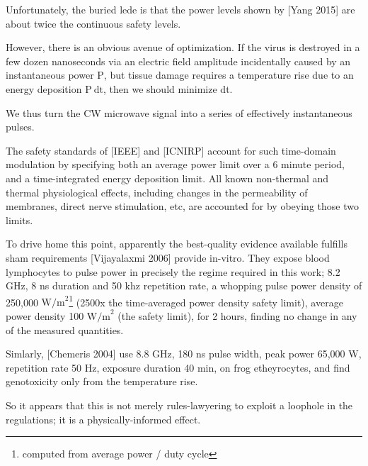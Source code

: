 \documentclass[fleqn,10pt]{article}
\begin{document}
Unfortunately, the buried lede is that the power levels shown by [Yang 2015] are about twice the continuous safety levels. 

However, there is an obvious avenue of optimization. If the virus is destroyed in a few dozen nanoseconds via an electric field amplitude incidentally caused by an instantaneous power $\text{P}$, but tissue damage requires a temperature rise due to an energy deposition $\text{P} \  \text{dt}$, then we should minimize dt.\

We thus turn the CW microwave signal into a series of effectively instantaneous pulses.

The safety standards of [IEEE] and [ICNIRP] account for such time-domain modulation by specifying both an average power limit over a 6 minute period, and a time-integrated energy deposition limit. All known non-thermal and thermal physiological effects, including changes in the permeability of membranes, direct nerve stimulation, etc, are accounted for by obeying those two limits.

To drive home this point, apparently the best-quality evidence available fulfills sham requirements [Vijayalaxmi 2006] provide in-vitro. They expose blood lymphocytes to pulse power in precisely the regime required in this work; 8.2 GHz, 8 ns duration and 50 khz repetition rate, a whopping pulse power density of 250,000 $\text{W/m}^2$\footnote{computed from average power / duty cycle} (2500x the time-averaged power density safety limit), average power density 100 $\text{W/m}^2$ (the safety limit), for 2 hours, finding no change in any of the measured quantities. 

Simlarly, [Chemeris 2004] use 8.8 GHz, 180 ns pulse width, peak power 65,000 W, repetition rate 50 Hz, exposure duration 40 min, on frog etheyrocytes, and find genotoxicity only from the temperature rise.

So it appears that this is not merely rules-lawyering to exploit a loophole in the regulations; it is a physically-informed effect.
\end{document}
